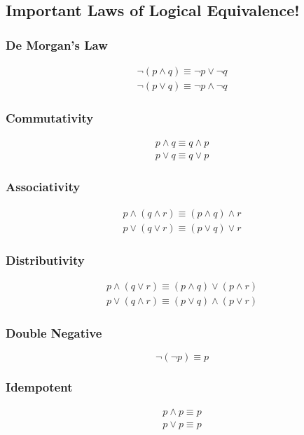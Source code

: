 \documentclass{report}
\begin{document}
\subsection*{Important Laws of Logical Equivalence!}
\begin{multicols}{2}
	\subsubsection*{De Morgan's Law}
	\begin{align*}
		\lnot(p\land q) \equiv \lnot p \lor \lnot q \\
		\lnot(p\lor q) \equiv \lnot p \land \lnot q 
	\end{align*}
	
	\subsubsection*{Commutativity}
	\begin{align*}
		p \land q \equiv q\land p \\
		p \lor q \equiv q \lor p
	\end{align*}
	
	\subsubsection*{Associativity}
	\begin{align*}
		p \land (q\land r) \equiv (p\land q) \land r \\
		p \lor (q\lor r) \equiv (p\lor q) \lor r	
	\end{align*}
	
	\subsubsection*{Distributivity}
	\begin{align*}
		p \land (q \lor r) \equiv (p\land q) \lor (p \land r) \\
		p \lor (q \land r) \equiv (p\lor q) \land (p \lor r)
	\end{align*}
	
	\subsubsection*{Double Negative}
	$$
		\lnot(\lnot p) \equiv p
	$$
	
	\subsubsection*{Idempotent}
	\begin{align*}
		p \land p \equiv p \\
		p \lor p \equiv p 
	\end{align*}
	

\end{multicols}
\end{document}
